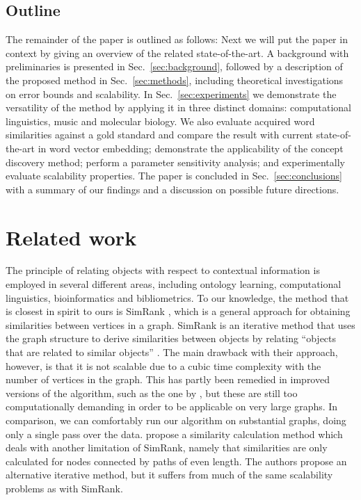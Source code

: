 \documentclass{kais}
\begin{document}
\subsection{Outline}
The remainder of the paper is outlined as follows: Next we will put the paper in context by giving an overview of the related
state-of-the-art. A background with preliminaries is presented in Sec.\ \ref{sec:background}, followed by a description of the
proposed method in Sec.\ \ref{sec:methods}, including theoretical investigations on error bounds and scalability. 
In Sec.\ \ref{sec:experiments} we demonstrate the versatility of the method by
applying it in three distinct domains: computational linguistics, music and molecular biology. We also evaluate acquired
word similarities against a gold standard and compare the result with current state-of-the-art in word vector embedding;
demonstrate the applicability of the concept discovery method; perform a parameter sensitivity analysis; and 
experimentally evaluate scalability properties. The paper is concluded in Sec.\ \ref{sec:conclusions} with a summary of our findings 
and a discussion on possible future directions.

\section{Related work}
\label{sec:related work}

The principle of relating objects with respect to contextual information is employed in several different areas, including ontology
learning, computational linguistics, bioinformatics and bibliometrics. To our knowledge, the method that is closest in spirit to
ours is SimRank \cite{Jeh2002simrank}, which is a general approach for obtaining similarities between vertices in a graph.
SimRank is an iterative method that uses the graph structure to derive similarities between objects by relating ``objects that are
related to similar objects'' \cite{Jeh2002simrank}. The main drawback with their approach, however, is that it is not scalable due to
a cubic time complexity with the number of vertices in the graph. This has partly been remedied in improved versions of the algorithm,
such as the one by , but these are still too computationally demanding in order to be applicable on
very large graphs. In comparison, we can comfortably run our algorithm on substantial graphs, doing only a single
pass over the data.
 propose a similarity calculation method which deals with another
limitation of SimRank, namely that similarities are only calculated for nodes connected by paths of
even length. The authors propose an alternative iterative method, but it suffers from much of the same scalability
problems as with SimRank.
\end{document}
